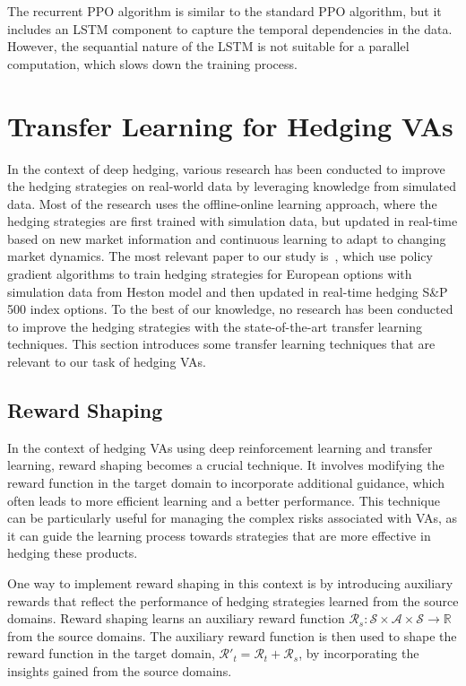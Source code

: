 The recurrent PPO algorithm is similar to the standard PPO algorithm, but it includes an LSTM component to capture the temporal dependencies in the data.
However, the sequantial nature of the LSTM is not suitable for a parallel computation, which slows down the training process.

\section{Transfer Learning for Hedging VAs} \label{sec:TransferLearning}

In the context of deep hedging, various research has been conducted to improve the hedging strategies on real-world data by leveraging knowledge from simulated data.
Most of the research uses the offline-online learning approach, where the hedging strategies are first trained with simulation data, but updated in real-time based on new market information and continuous learning to adapt to changing market dynamics.
The most relevant paper to our study is~\cite{xiao2021optimal}, which use policy gradient algorithms to train hedging strategies for European options with simulation data from Heston model and then updated in real-time hedging S\&P 500 index options.
To the best of our knowledge, no research has been conducted to improve the hedging strategies with the state-of-the-art transfer learning techniques.
This section introduces some transfer learning techniques that are relevant to our task of hedging VAs.

\subsection{Reward Shaping}

In the context of hedging VAs using deep reinforcement learning and transfer learning, reward shaping becomes a crucial technique. 
It involves modifying the reward function in the target domain to incorporate additional guidance, which often leads to more efficient learning and a better performance.
This technique can be particularly useful for managing the complex risks associated with VAs, as it can guide the learning process towards strategies that are more effective in hedging these products.

One way to implement reward shaping in this context is by introducing auxiliary rewards that reflect the performance of hedging strategies learned from the source domains.
Reward shaping learns an auxiliary reward function $\mathcal{R}_s: \mathcal{S} \times \mathcal{A} \times \mathcal{S} \rightarrow \mathbb{R}$ from the source domains.
The auxiliary reward function is then used to shape the reward function in the target domain, $\mathcal{R}'_t = \mathcal{R}_t + \mathcal{R}_s$, by incorporating the insights gained from the source domains.

